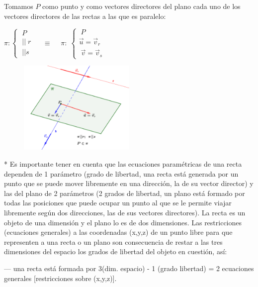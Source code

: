 \begin{multicols}{2}
\noindent Tomamos $P$ como punto y como vectores directores del plano cada uno de los vectores directores de las rectas a las que es paralelo:

\vspace{3mm}\centerline{$\pi: \begin{cases} \; P\\ \; ||\; r \\ \; || s \end{cases} \; \quad \equiv \quad  \; \pi:\; \begin{cases} \; P\\ \vec u=\vec v_r \\ \; \vec v=\vec v_s \end{cases}$}

	\begin{figure}[H]
		\centering
		\includegraphics[width=0.5\textwidth]{imagenes/imagenes10/T10IM04.png}
	\end{figure}
\end{multicols}

\justify

* Es importante tener en cuenta que las ecuaciones paramétricas de una recta dependen de 1 parámetro (grado de libertad, una recta está generada por un punto que se puede mover libremente en una dirección, la de su vector director) y las del plano de 2 parámetros (2 grados de libertad, un plano está formado por todas las posiciones que puede ocupar un punto al que se le permite viajar libremente según dos direcciones, las de sus vectores directores). La recta es un objeto de una dimensión y el plano lo es de dos dimensiones. Las restricciones (ecuaciones generales) a las coordenadas (x,y,z) de un punto libre para que representen a una recta o un plano son consecuencia de restar a las tres dimensiones del espacio los grados de libertad del objeto en cuestión, así:

--- una recta está formada por 3(dim. espacio) - 1 (grado libertad) = 2 ecuaciones generales [restricciones sobre (x,y,z)].

